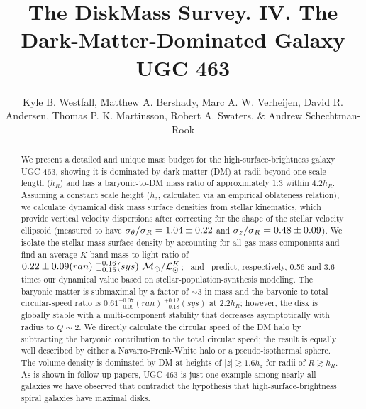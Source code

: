 \documentclass[apj,iop,numberedappendix]{emulateapj}
\begin{document}
\title{The DiskMass Survey. IV. The Dark-Matter-Dominated Galaxy UGC 463 }

\author{Kyle B. Westfall, Matthew A.
Bershady, Marc A. W. Verheijen, David R.
Andersen, Thomas P. K. Martinsson, Robert A.
Swaters, \& Andrew Schechtman-Rook}







\begin{abstract}

We present a detailed and unique mass budget for the high-surface-brightness
galaxy UGC 463, showing it is dominated by dark matter (DM) at radii beyond one
scale length ($h_R$) and has a baryonic-to-DM mass ratio of approximately 1:3
within 4.2$h_R$.  Assuming a constant scale height ($h_z$, calculated via an
empirical oblateness relation), we calculate dynamical disk mass surface
densities from stellar kinematics, which provide vertical velocity dispersions
after correcting for the shape of the stellar velocity ellipsoid (measured to
have $\sigma_{\theta}/\sigma_R=1.04\pm0.22$ and $\sigma_z/\sigma_R=0.48\pm0.09$).  We isolate the
stellar mass surface density by accounting for all gas mass components and find
an average $K$-band mass-to-light ratio of
$0.22\pm0.09(ran)~^{+0.16}_{-0.15}(sys)~\mathcal{M}_\odot/\mathcal{L}_\odot^K$;
\citeauthor{2009MNRAS.400.1181Z}\ and \citeauthor{2003ApJS..149..289B}\ predict,
respectively, 0.56 and 3.6 times our dynamical value based on
stellar-population-synthesis modeling.  The baryonic matter is submaximal by a
factor of $\sim3$ in mass and the baryonic-to-total circular-speed ratio is
$0.61^{+0.07}_{-0.09}(ran)~^{+0.12}_{-0.18}(sys)$ at 2.2$h_R$; however, the disk
is globally stable with a multi-component stability that decreases
asymptotically with radius to $Q\sim2$.  We directly calculate the circular
speed of the DM halo by subtracting the baryonic contribution to the total
circular speed; the result is equally well described by either a
Navarro-Frenk-White halo or a pseudo-isothermal sphere.  The volume density is
dominated by DM at heights of $|z|\gtrsim1.6h_z$ for radii of $R\gtrsim h_R$.
As is shown in follow-up papers, UGC 463 is just one example among nearly all
galaxies we have observed that contradict the hypothesis that
high-surface-brightness spiral galaxies have maximal disks.

\end{abstract}
\end{document}
